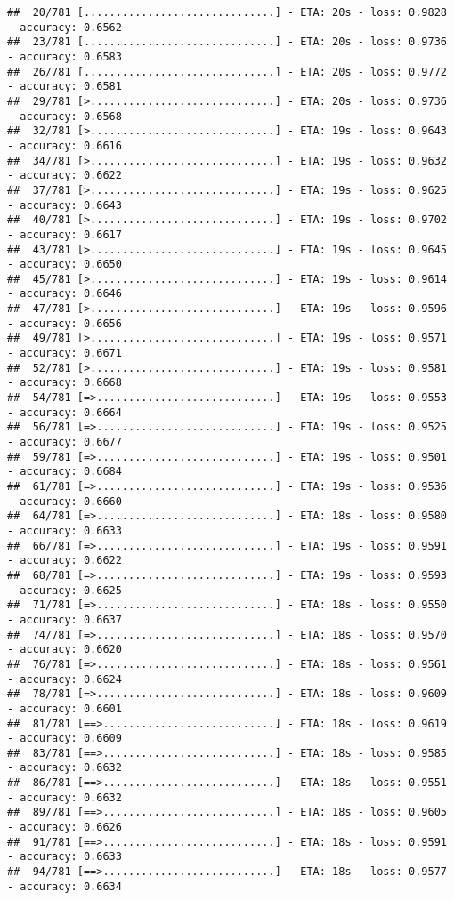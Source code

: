 \documentclass[
]{article}
\begin{document}
\begin{verbatim}
##  20/781 [..............................] - ETA: 20s - loss: 0.9828 - accuracy: 0.6562
##  23/781 [..............................] - ETA: 20s - loss: 0.9736 - accuracy: 0.6583
##  26/781 [..............................] - ETA: 20s - loss: 0.9772 - accuracy: 0.6581
##  29/781 [>.............................] - ETA: 20s - loss: 0.9736 - accuracy: 0.6568
##  32/781 [>.............................] - ETA: 19s - loss: 0.9643 - accuracy: 0.6616
##  34/781 [>.............................] - ETA: 19s - loss: 0.9632 - accuracy: 0.6622
##  37/781 [>.............................] - ETA: 19s - loss: 0.9625 - accuracy: 0.6643
##  40/781 [>.............................] - ETA: 19s - loss: 0.9702 - accuracy: 0.6617
##  43/781 [>.............................] - ETA: 19s - loss: 0.9645 - accuracy: 0.6650
##  45/781 [>.............................] - ETA: 19s - loss: 0.9614 - accuracy: 0.6646
##  47/781 [>.............................] - ETA: 19s - loss: 0.9596 - accuracy: 0.6656
##  49/781 [>.............................] - ETA: 19s - loss: 0.9571 - accuracy: 0.6671
##  52/781 [>.............................] - ETA: 19s - loss: 0.9581 - accuracy: 0.6668
##  54/781 [=>............................] - ETA: 19s - loss: 0.9553 - accuracy: 0.6664
##  56/781 [=>............................] - ETA: 19s - loss: 0.9525 - accuracy: 0.6677
##  59/781 [=>............................] - ETA: 19s - loss: 0.9501 - accuracy: 0.6684
##  61/781 [=>............................] - ETA: 19s - loss: 0.9536 - accuracy: 0.6660
##  64/781 [=>............................] - ETA: 18s - loss: 0.9580 - accuracy: 0.6633
##  66/781 [=>............................] - ETA: 19s - loss: 0.9591 - accuracy: 0.6622
##  68/781 [=>............................] - ETA: 19s - loss: 0.9593 - accuracy: 0.6625
##  71/781 [=>............................] - ETA: 18s - loss: 0.9550 - accuracy: 0.6637
##  74/781 [=>............................] - ETA: 18s - loss: 0.9570 - accuracy: 0.6620
##  76/781 [=>............................] - ETA: 18s - loss: 0.9561 - accuracy: 0.6624
##  78/781 [=>............................] - ETA: 18s - loss: 0.9609 - accuracy: 0.6601
##  81/781 [==>...........................] - ETA: 18s - loss: 0.9619 - accuracy: 0.6609
##  83/781 [==>...........................] - ETA: 18s - loss: 0.9585 - accuracy: 0.6632
##  86/781 [==>...........................] - ETA: 18s - loss: 0.9551 - accuracy: 0.6632
##  89/781 [==>...........................] - ETA: 18s - loss: 0.9605 - accuracy: 0.6626
##  91/781 [==>...........................] - ETA: 18s - loss: 0.9591 - accuracy: 0.6633
##  94/781 [==>...........................] - ETA: 18s - loss: 0.9577 - accuracy: 0.6634

\end{verbatim}
\end{document}
